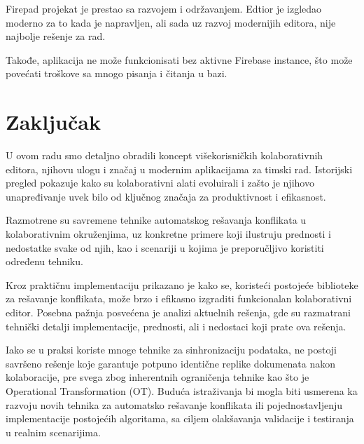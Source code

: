 \documentclass[12pt]{article}
\newcommand{\startnewsection}{
    \clearpage %
    \ifodd\value{page}\else %
        \hbox{} %
        \newpage %
    \fi
}
\begin{document}
Firepad projekat je prestao sa razvojem i održavanjem. Edtior je izgledao moderno za to kada je napravljen, ali sada uz razvoj modernijih editora, nije najbolje rešenje za rad.

Takođe, aplikacija ne može funkcionisati bez aktivne Firebase instance, što može povećati troškove sa mnogo pisanja i čitanja u bazi.


\startnewsection
\section{Zaključak}

U ovom radu smo detaljno obradili koncept višekorisničkih kolaborativnih editora, njihovu ulogu i značaj u modernim aplikacijama za timski rad. Istorijski pregled pokazuje kako su kolaborativni alati evoluirali i zašto je njihovo unapređivanje uvek bilo od ključnog značaja za produktivnost i efikasnost.

Razmotrene su savremene tehnike automatskog rešavanja konflikata u kolaborativnim okruženjima, uz konkretne primere koji ilustruju prednosti i nedostatke svake od njih, kao i scenariji u kojima je preporučljivo koristiti određenu tehniku.

Kroz praktičnu implementaciju prikazano je kako se, koristeći postojeće biblioteke za rešavanje konflikata, može brzo i efikasno izgraditi funkcionalan kolaborativni editor. Posebna pažnja posvećena je analizi aktuelnih rešenja, gde su razmatrani tehnički detalji implementacije, prednosti, ali i nedostaci koji prate ova rešenja.

Iako se u praksi koriste mnoge tehnike za sinhronizaciju podataka, ne postoji savršeno rešenje koje garantuje potpuno identične replike dokumenata nakon kolaboracije, pre svega zbog inherentnih ograničenja tehnike kao što je Operational Transformation (OT). Buduća istraživanja bi mogla biti usmerena ka razvoju novih tehnika za automatsko rešavanje konflikata ili pojednostavljenju implementacije postojećih algoritama, sa ciljem olakšavanja validacije i testiranja u realnim scenarijima.

\newpage

\nocite{*}

\printbibliography[title={Literatura}]
\end{document}
